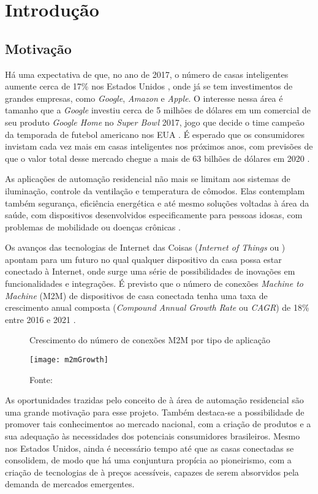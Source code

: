 \chapter{Introdução}

\section{Motivação}
Há uma expectativa de que, no ano de 2017, o número de casas inteligentes aumente cerca de 17\% nos Estados Unidos \cite{mckinseyReport}, onde já se tem investimentos de grandes empresas, como \emph{Google}, \emph{Amazon} e \emph{Apple}. O interesse nessa área é tamanho que a \emph{Google} investiu cerca de 5 milhões de dólares em um comercial de seu produto \emph{Google Home} no \emph{Super Bowl} 2017, jogo que decide o time campeão da temporada de futebol americano nos EUA \cite{kennemer}. É esperado que os consumidores invistam cada vez mais em casas inteligentes nos próximos anos, com previsões de que o valor total desse mercado chegue a mais de 63 bilhões de dólares em 2020 \cite{businessWire}.

As aplicações de automação residencial não mais se limitam aos sistemas de iluminação, controle da ventilação e temperatura de cômodos. Elas contemplam também segurança, eficiência energética e até mesmo soluções voltadas à área da saúde, com dispositivos desenvolvidos especificamente para pessoas idosas, com problemas de mobilidade ou doenças crônicas \cite{iscoop}.

Os avanços das tecnologias de Internet das Coisas (\textit{Internet of Things} ou \wiot{}) apontam para um futuro no qual qualquer dispositivo da casa possa estar conectado à Internet, onde surge uma série de possibilidades de inovações em funcionalidades e integrações. É previsto que o número de conexões \textit{Machine to Machine} (M2M) de dispositivos de casa conectada tenha uma taxa de crescimento anual composta (\emph{Compound Annual Growth Rate} ou \emph{CAGR}) de 18\% entre 2016 e 2021 \cite{ciscoReport}.

\begin{figure}[H]
	\centering
	\caption{Crescimento do número de conexões M2M por tipo de aplicação}
  \texttt{[image: m2mGrowth]}
	\caption*{Fonte: \cite{ciscoReport}}
\label{fig:m2mGrowth}
\end{figure}

As oportunidades trazidas pelo conceito de \wiot{} à área de automação residencial são uma grande motivação para esse projeto. Também destaca-se a possibilidade de promover tais conhecimentos ao mercado nacional, com a criação de produtos e a sua adequação às necessidades dos potenciais consumidores brasileiros. Mesmo nos Estados Unidos, ainda é necessário tempo até que as casas conectadas se consolidem, de modo que há uma conjuntura propícia ao pioneirismo, com a criação de tecnologias de \wiot{} à preços acessíveis, capazes de serem absorvidos pela demanda de mercados emergentes.

